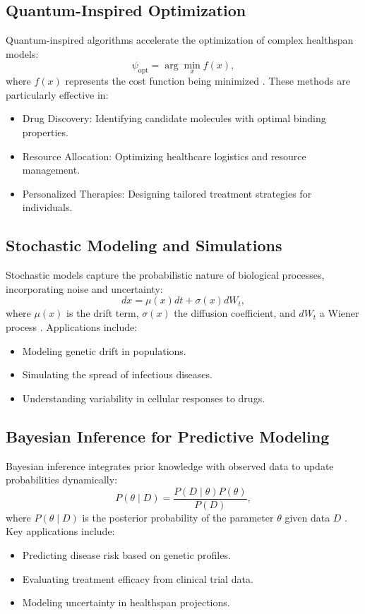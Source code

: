 \documentclass{article}
\theoremstyle{plain}
\begin{document}
\subsection{Quantum-Inspired Optimization}
Quantum-inspired algorithms accelerate the optimization of complex healthspan models:
\begin{equation}
\psi_{\text{opt}} = \arg\min_x f(x),
\end{equation}
where $f(x)$ represents the cost function being minimized \cite{quantumOptimization2023}. These methods are particularly effective in:
\begin{itemize}
    \item Drug Discovery: Identifying candidate molecules with optimal binding properties.
    \item Resource Allocation: Optimizing healthcare logistics and resource management.
    \item Personalized Therapies: Designing tailored treatment strategies for individuals.
\end{itemize}

\subsection{Stochastic Modeling and Simulations}
Stochastic models capture the probabilistic nature of biological processes, incorporating noise and uncertainty:
\begin{equation}
dx = \mu(x)dt + \sigma(x)dW_t,
\end{equation}
where $\mu(x)$ is the drift term, $\sigma(x)$ the diffusion coefficient, and $dW_t$ a Wiener process \cite{stochasticModeling2023}. Applications include:
\begin{itemize}
    \item Modeling genetic drift in populations.
    \item Simulating the spread of infectious diseases.
    \item Understanding variability in cellular responses to drugs.
\end{itemize}

\subsection{Bayesian Inference for Predictive Modeling}
Bayesian inference integrates prior knowledge with observed data to update probabilities dynamically:
\begin{equation}
P(\theta \mid D) = \frac{P(D \mid \theta) P(\theta)}{P(D)},
\end{equation}
where $P(\theta \mid D)$ is the posterior probability of the parameter $\theta$ given data $D$ \cite{bayesianInference2023}. Key applications include:
\begin{itemize}
    \item Predicting disease risk based on genetic profiles.
    \item Evaluating treatment efficacy from clinical trial data.
    \item Modeling uncertainty in healthspan projections.
\end{itemize}
\end{document}
